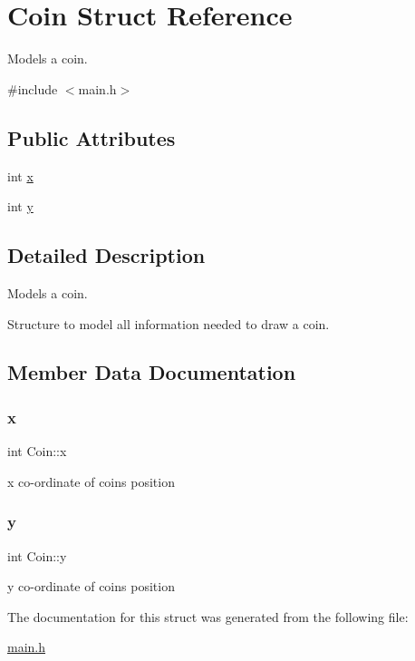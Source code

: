 \hypertarget{struct_coin}{}\section{Coin Struct Reference}
\label{struct_coin}


Models a coin.  




{\ttfamily \#include $<$main.\+h$>$}

\subsection*{Public Attributes}
\begin{DoxyCompactItemize}
\item 
int \hyperlink{struct_coin_ab70f9405edd662a3943b83f058e2501f}{x}
\item 
int \hyperlink{struct_coin_a88562a5f8129840729ab0ecf15edde3d}{y}
\end{DoxyCompactItemize}


\subsection{Detailed Description}
Models a coin. 

Structure to model all information needed to draw a coin. 

\subsection{Member Data Documentation}
\mbox{\label{struct_coin_ab70f9405edd662a3943b83f058e2501f}} 
\subsubsection{\texorpdfstring{x}{x}}
{\footnotesize\ttfamily int Coin\+::x}

x co-\/ordinate of coins position \mbox{\label{struct_coin_a88562a5f8129840729ab0ecf15edde3d}} 
\subsubsection{\texorpdfstring{y}{y}}
{\footnotesize\ttfamily int Coin\+::y}

y co-\/ordinate of coins position 

The documentation for this struct was generated from the following file\+:\begin{DoxyCompactItemize}
\item 
\hyperlink{main_8h}{main.\+h}\end{DoxyCompactItemize}
